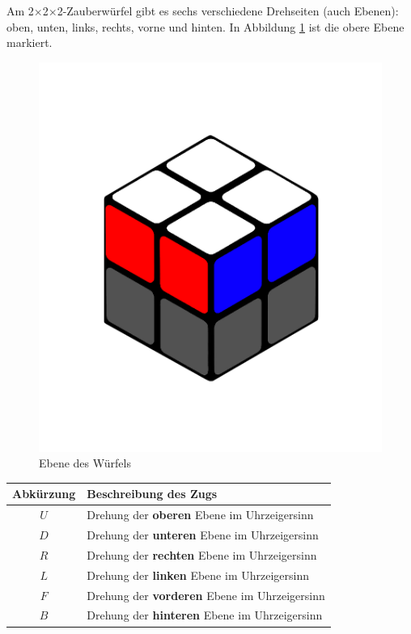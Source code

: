 \documentclass[12pt,a4paper, usenames, dvipsnames]{article}
\theoremstyle{mystyle}
\theoremstyle{definition}
\newcommand{\Ttwo}{2$\times$2$\times$2-}
\begin{document}
\label{Abschnitt_GrundzügeWürfel}
Am \Ttwo Zauberwürfel gibt es sechs verschiedene Drehseiten (auch Ebenen): oben, unten, links, rechts, vorne und hinten. 
In Abbildung \ref{Abbildung_Ebene} ist die obere Ebene markiert.

\begin{figure}[H]
\centering
\includegraphics[scale=0.1]{ebene.png}
\caption[Ebene des Würfels]{Ebene des Würfels}
\label{Abbildung_Ebene}
\end{figure}

\begin{center}
\begin{tabular}{cl}
\toprule
\textbf{Abkürzung} & \textbf{Beschreibung des Zugs} \\
\midrule
$U$ & Drehung der \textbf{oberen} Ebene im Uhrzeigersinn \\
$D$ & Drehung der \textbf{unteren} Ebene im Uhrzeigersinn \\
$R$ & Drehung der \textbf{rechten} Ebene im Uhrzeigersinn \\
$L$ & Drehung der \textbf{linken} Ebene im Uhrzeigersinn \\
$F$ & Drehung der \textbf{vorderen} Ebene im Uhrzeigersinn \\
$B$ & Drehung der \textbf{hinteren} Ebene im Uhrzeigersinn \\
\bottomrule
\end{tabular} 
\end{center}
\end{document}
